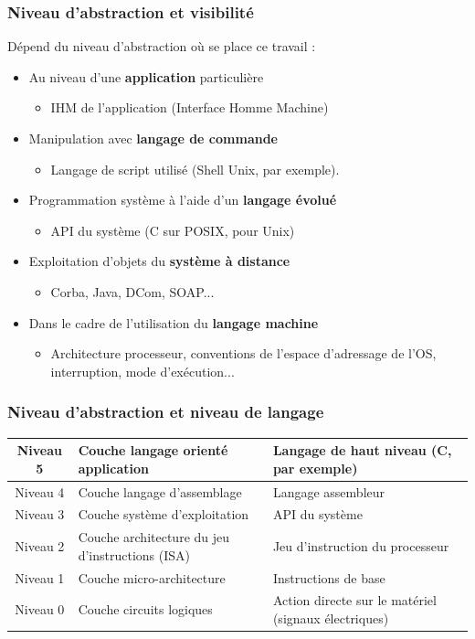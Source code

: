 \begin{frame}
 \frametitle{Niveau d'abstraction et visibilité}
Dépend du niveau d'abstraction où se place ce travail :
 \begin{itemize}
 \item<1> Au niveau d'une \textbf{application} particulière
 \begin{itemize}
 \item IHM de l'application (Interface Homme Machine)
 \end{itemize}
 \item<2> Manipulation avec \textbf{langage de commande}
 \begin{itemize}
 \item Langage de script utilisé (Shell Unix, par exemple).
 \end{itemize}
 \item<3> Programmation système à l'aide d'un \textbf{langage évolué}
 \begin{itemize}
 \item API du système (C sur POSIX, pour Unix)
 \end{itemize}
 \item<4> Exploitation d'objets du \textbf{système à distance}
 \begin{itemize}
 \item Corba, Java, DCom, SOAP...
 \end{itemize}
 \item<5> Dans le cadre de l'utilisation du \textbf{langage machine}
 \begin{itemize}
 \item Architecture processeur, conventions de l'espace d'adressage de l'OS, interruption, mode d'exécution...
 \end{itemize} 
 \end{itemize}
\end{frame}

\begin{frame}
\frametitle{Niveau d'abstraction et niveau de langage}
\begin{tabular}{c|p{4.5cm}|p{4cm}}
Niveau 5 & Couche langage orienté application & Langage de haut niveau (C, par exemple) \\
\hline
Niveau 4 & Couche langage d'assemblage & Langage assembleur \\
\hline
Niveau 3 & Couche système d'exploitation & API du système \\
\hline
Niveau 2 & Couche architecture du jeu d'instructions (ISA) & Jeu d'instruction du processeur \\
\hline
Niveau 1 & Couche micro-architecture & Instructions de base \\
\hline
Niveau 0 & Couche circuits logiques & Action directe sur le matériel (signaux électriques)\\
\end{tabular}
\end{frame}





